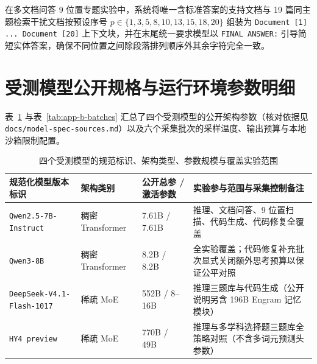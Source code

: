 在多文档问答 9 位置专题实验中，系统将唯一含标准答案的支持文档与 19 篇同主题检索干扰文档按预设序号 $p \in \{1,3,5,8,10,13,15,18,20\}$ 组装为 \texttt{Document [1] ... Document [20]} 上下文块，并在末尾统一要求模型以 \texttt{FINAL ANSWER:} 引导简短实体答案，确保不同位置之间除段落排列顺序外其余字符完全一致。

\section{受测模型公开规格与运行环境参数明细}

表~\ref{tab:app-b-models} 与表~\ref{tab:app-b-batches} 汇总了四个受测模型的公开架构参数（核对依据见 \texttt{docs/model-spec-sources.md}）以及六个采集批次的采样温度、输出预算与本地沙箱限制配置。

{\setlength{\parfillskip}{0pt plus 1fil}
\begin{table}[!htbp]
\centering
\caption{四个受测模型的规范标识、架构类型、参数规模与覆盖实验范围}\label{tab:app-b-models}
\ReportTableStyle
\begin{tabularx}{\linewidth}{@{}>{\raggedright\arraybackslash}p{3.35cm} >{\raggedright\arraybackslash}p{2.25cm} >{\raggedright\arraybackslash}p{2.4cm} >{\raggedright\arraybackslash}X@{}}
\toprule
\textbf{规范化模型版本标识} & \textbf{架构类别} & \textbf{公开总参 / 激活参数} & \textbf{实验参与范围与采集控制备注} \\
\midrule
\texttt{Qwen2.5-7B-Instruct} & 稠密 Transformer & 7.61B / 7.61B & 推理、文档问答、9 位置扫描、代码生成、代码修复全覆盖 \\
\texttt{Qwen3-8B} & 稠密 Transformer & 8.2B / 8.2B & 全实验覆盖；代码修复补充批次显式关闭额外思考预算以保证公平对照 \\
\texttt{DeepSeek-V4.1-Flash-1017} & 稀疏 MoE & 552B / 8--16B & 推理三题库与代码生成（公开说明另含 196B Engram 记忆模块） \\
\texttt{HY4 preview} & 稀疏 MoE & 770B / 49B & 推理与多学科选择题三题库全策略对照（不含多词元预测头参数） \\
\bottomrule
\end{tabularx}
\end{table}

}
